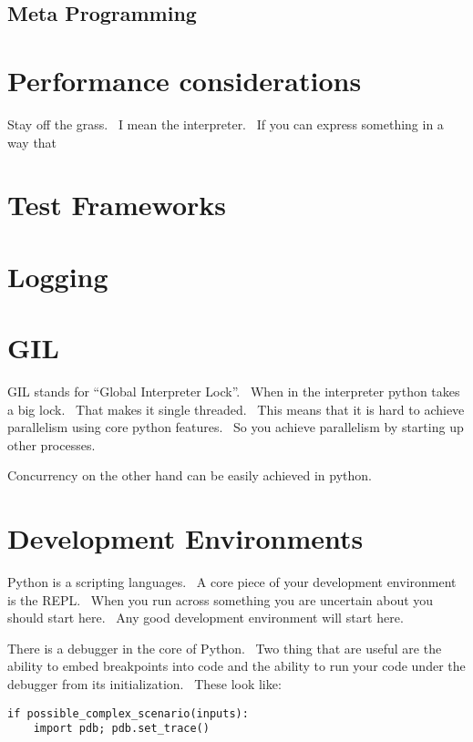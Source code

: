 \documentclass[]{article}
\begin{document}
\subsection{Meta Programming}

\section{Performance considerations}

Stay off the grass. ~I mean the interpreter. ~If you can express
something in a way that

\section{Test Frameworks}

\section{Logging}

\section{GIL}

GIL stands for ``Global Interpreter Lock''. ~When in the interpreter
python takes a big lock. ~That makes it single threaded. ~This means
that it is hard to achieve parallelism using core python features. ~So
you achieve parallelism by starting up other processes.

Concurrency on the other hand can be easily achieved in python.

\section{Development Environments}

Python is a scripting languages. ~A core piece of your development
environment is the REPL. ~When you run across something you are
uncertain about you should start here. ~Any good development environment
will start here.

There is a debugger in the core of Python. ~Two thing that are useful
are the ability to embed breakpoints into code and the ability to run
your code under the debugger from its initialization. ~These look like:

\begin{verbatim}
if possible_complex_scenario(inputs):
    import pdb; pdb.set_trace()
\end{verbatim}
\end{document}
